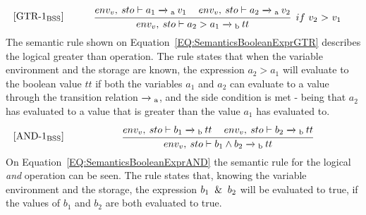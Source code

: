 \begin{equation}\label{EQ:SemanticsBooleanExprGTR}
\begin{minipage}{.2\linewidth}
$[\text{GTR-1}_\text{BSS}]$
\end{minipage}
\begin{minipage}{.8\linewidth}
\centering
$\cfrac{env_v, \: sto \vdash a_1 \xrightarrow{}\textsubscript{a} \: v_1 \quad\: env_v, \: sto \vdash a_2 \xrightarrow{}\textsubscript{a} \: v_2}{env_v, \: sto \vdash a_2 > a_1 \xrightarrow{}\textsubscript{b} \: tt}$
$ \: if$ $v_2$ $>$ $v_1$
\end{minipage}
\end{equation}
The semantic rule shown on Equation~\ref{EQ:SemanticsBooleanExprGTR} describes the logical greater than operation. The rule states that when the variable environment and the storage are known, the expression $a_2 > a_1$ will evaluate to the boolean value $tt$ if both the variables $a_1$ and $a_2$ can evaluate to a value through the transition relation $\xrightarrow{} \textsubscript{a}$, and the side condition is met - being that $a_2$ has evaluated to a value that is greater than the value $a_1$ has evaluated to.
\begin{equation}\label{EQ:SemanticsBooleanExprAND}
\begin{minipage}{.2\linewidth}
$[\text{AND-1}_\text{BSS}]$
\end{minipage}
\begin{minipage}{.8\linewidth}
\centering
$\cfrac{env_v, \: sto \vdash b_1 \xrightarrow{}\textsubscript{b} \: tt \quad\: env_v, \: sto \vdash b_2 \xrightarrow{}\textsubscript{b} \: tt}{env_v, \: sto \vdash b_1 \wedge b_2 \xrightarrow{}\textsubscript{b} \: tt}$
\end{minipage}
\end{equation}
On Equation~\ref{EQ:SemanticsBooleanExprAND} the semantic rule for the logical \textit{and} operation can be seen. The rule states that, knowing the variable environment and the storage, the expression $b_1 \And b_2$ will be evaluated to true, if the values of $b_1$ and $b_2$ are both evaluated to true.




